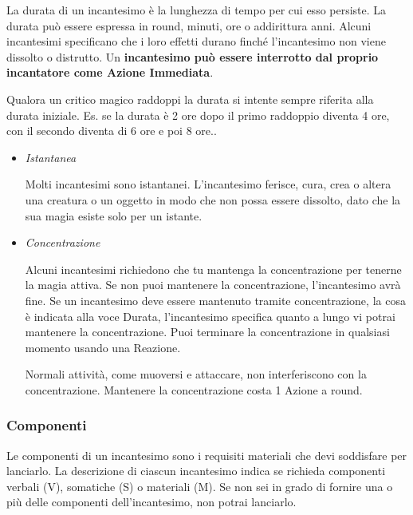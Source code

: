 \begin{multicols}{2}
La durata di un incantesimo è la lunghezza di tempo per cui esso persiste. La durata può essere espressa in round, minuti, ore o addirittura anni. Alcuni incantesimi specificano che i loro effetti durano finché l'incantesimo non viene dissolto o distrutto. Un \textbf{incantesimo può essere interrotto dal proprio incantatore come Azione Immediata}.

Qualora un critico magico raddoppi la durata si intente sempre riferita alla durata iniziale. Es. se la durata è 2 ore dopo il primo raddoppio diventa 4 ore, con il secondo diventa di 6 ore e poi 8 ore..

\begin{itemize}[leftmargin=*] \setlength{\itemsep}{0pt}

\item
\emph{Istantanea}

Molti incantesimi sono istantanei. L'incantesimo ferisce, cura, crea o altera una creatura o un oggetto in modo che non possa essere dissolto, dato che la sua magia esiste solo per un istante.

\item

\emph{Concentrazione}

Alcuni incantesimi richiedono che tu mantenga la concentrazione per tenerne la magia attiva. Se non puoi mantenere la concentrazione, l'incantesimo avrà fine. Se un incantesimo deve essere mantenuto tramite concentrazione, la cosa è indicata alla voce Durata, l'incantesimo specifica quanto a lungo vi potrai mantenere la concentrazione. Puoi terminare la concentrazione in qualsiasi momento usando una Reazione.

Normali attività, come muoversi e attaccare, non interferiscono con la concentrazione. Mantenere la concentrazione costa 1 Azione a round.
\end{itemize}

\subsubsection{Componenti}\label{magiecomponenti}

Le componenti di un incantesimo sono i requisiti materiali che devi soddisfare per lanciarlo. La descrizione di ciascun incantesimo indica se richieda componenti verbali (V), somatiche (S) o materiali (M). Se non sei in grado di fornire una o più delle componenti dell'incantesimo, non potrai lanciarlo.


\end{multicols}
